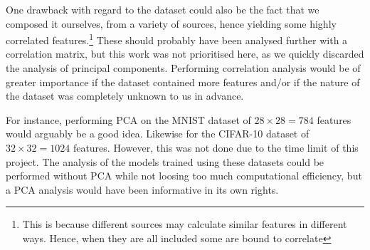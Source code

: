     One drawback with regard to the dataset could also be the fact that we composed it ourselves, from a variety of sources, hence yielding some highly correlated features.\footnote{This is because different sources may calculate similar features in different ways. Hence, when they are all included some are bound to correlate} These should probably have been analysed further with a correlation matrix, but this work was not prioritised here, as we quickly discarded the analysis of principal components. Performing correlation analysis would be of greater importance if the dataset contained more features and/or if the nature of the dataset was completely unknown to us in advance. 

    For instance, performing PCA on the MNIST dataset of $28\times 28 = 784$ features would arguably be a good idea. Likewise for the CIFAR-10 dataset of $32\times 32 = 1024$ features. However, this was not done due to the time limit of this project. The analysis of the models trained using these datasets could be performed without PCA while not loosing too much computational efficiency, but a PCA analysis would have been informative in its own rights. 





